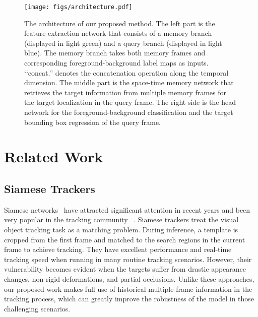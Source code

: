 \documentclass[final]{cvpr}
\begin{document}
\begin{figure*}[t]
    \centering
    \texttt{[image: figs/architecture.pdf]}
    \vspace{-1.0em}
    \caption{The architecture of our proposed method. The left part is the feature extraction network that consists of a memory branch (displayed in \textcolor{color_memory_branch}{light green}) and a query branch (displayed in \textcolor{color_query_branch}{light blue}). The memory branch takes both memory frames and corresponding foreground-background label maps as inputs. \lq\lq{concat.}\rq\rq{} denotes the concatenation operation along the temporal dimension. The middle part is the space-time memory network that retrieves the target information from multiple memory frames for the target localization in the query frame. The right side is the head network for the foreground-background classification and the target bounding box regression of the query frame.}
    \label{fig:architecture}
 \vspace{-1.0em}
\end{figure*}

\section{Related Work}
\subsection{Siamese Trackers}
Siamese networks~\cite{bromley1993signature,zagoruyko2015learning,chopra2005learning} have attracted significant attention in recent years and been very popular in the tracking community~\cite{bertinetto2016fully,zhu2018distractor,zhang2019deeper,fan2019siamese,wang2019fast,chen2020siamese,li2018high,li2019siamrpn++,xu2020siamfc++,guo2020siamcar} .
Siamese trackers treat the visual object tracking task as a matching problem.
During inference, a template is cropped from the first frame and matched to the search regions in the current frame to achieve tracking.
They have excellent performance and real-time tracking speed when running in many routine tracking scenarios.
However, their vulnerability becomes evident when the targets suffer from drastic appearance changes, non-rigid deformations, and partial occlusions.
Unlike these approaches, our proposed work makes full use of historical multiple-frame information in the tracking process, which can greatly improve the robustness of the model in those challenging scenarios.
\end{document}
